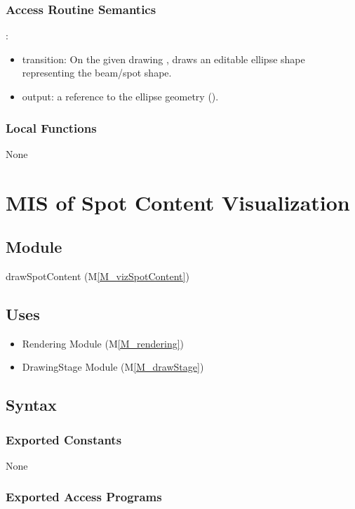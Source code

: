 \documentclass[12pt, titlepage]{article}
\newcommand{\mref}[1]{M\ref{#1}}
\newcommand{\mrefp}[1]{(\mref{#1})}
\newcommand{\mreff}[1]{Module \mrefp{#1}}
\begin{document}
\subsubsection{Access Routine Semantics}

\noindent {}:
\begin{itemize}
\item transition: On the given drawing ,
  draws an editable ellipse shape representing the beam/spot shape.
\item output: a reference to the ellipse geometry ().
\end{itemize}

\subsubsection{Local Functions}
None

\newpage



\section{MIS of Spot Content Visualization} \label{MS_vizSpotContent}

\subsection{Module}
drawSpotContent \mrefp{M_vizSpotContent}

\subsection{Uses}
\begin{itemize}
  \item Rendering \mreff{M_rendering}
  \item DrawingStage \mreff{M_drawStage}
\end{itemize}

\subsection{Syntax}

\subsubsection{Exported Constants}
None
\subsubsection{Exported Access Programs}
\end{document}
